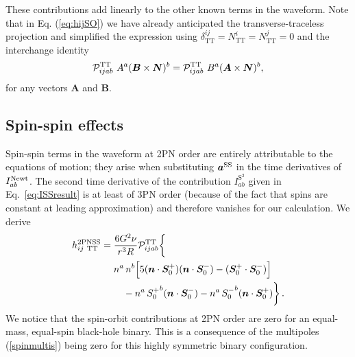 \documentclass[aps, prd,
twocolumn,%
superscriptaddress,
showpacs, nofootinbib, eqsecnum, amsmath, amssymb, floatfix
]{revtex4}
\newcommand{\bmSeffp}{{\bm{S}_{0}^+}}
\newcommand{\bmSeffm}{{\bm{S}_{0}^-}}
\newcommand{\Seffp}{{S_{0}^+}}
\newcommand{\Seffm}{{S_{0}^-}}
\begin{document}
These contributions add linearly to the other known terms in the
waveform. Note that in Eq. (\ref{eq:hijSO}) we have already
anticipated the transverse-traceless projection and simplified the
expression using
$\delta^{ij}_{\mathrm{TT}}=N^i_{\mathrm{TT}}=N^j_{\mathrm{TT}}=0$
and the interchange identity \cite{Kidder:1995zr}
\begin{equation}
 {\cal P}_{ijab}^{\mathrm{TT}} \  A^a (\bm{B}\times \bm{N})^b=
{\cal P}_{ijab}^{\mathrm{TT}}\  B^a(\bm{A}\times \bm{N})^b,
\end{equation}
for any vectors $\bm{A}$ and $\bm{B}$.



\subsection{Spin-spin effects}
\label{sec:SS}

Spin-spin terms in the waveform at 2PN order are entirely
attributable to the equations of motion; they arise when
substituting $\bm{a}^{\rm SS}$ in the time derivatives of
$I_{ab}^{\rm Newt}$. The second time derivative of the contribution
$I_{ab}^{\text{S}^2}$ given in Eq.~\eqref{eq:ISSresult} is at least
of 3PN order (because of the fact that spins are constant at leading
approximation) and therefore vanishes for our calculation. We derive
 \begin{align}
\label{eq:hijSS}
  h^{\rm 2PN  SS}_{{ij \   {\mathrm{TT}}}} &=\frac{6G^2 \nu}{r^3 R} {\cal
    P}_{ijab}^{\mathrm{TT}}
\bigg\{ \nonumber \\ & \quad ~ n^a \, n^b  \Big[5 (\bm{n}\cdot
\bmSeffp)(\bm{n}\cdot \bmSeffm)-
 (\bmSeffp\cdot \bmSeffm) \Big]\nonumber\\
& \qquad ~ -  n^a \, \Seffp^b (\bm{n}\cdot \bmSeffm)- n^a \,
\Seffm^b (\bm{n}\cdot \bmSeffp)  \bigg\}\,.
\end{align}
We notice that the spin-orbit contributions at 2PN order are zero
for an equal-mass, equal-spin black-hole binary. This is a
consequence of the multipoles (\ref{spinmultis}) being zero for this
highly symmetric binary configuration.
\end{document}
